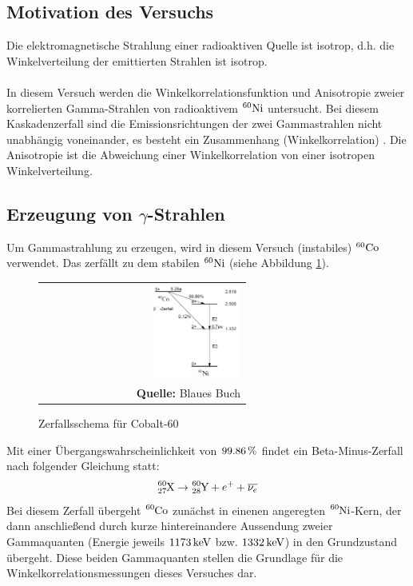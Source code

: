 \documentclass[a4paper,titlepage]{scrartcl}
\numberwithin{equation}{section}
\begin{document}
\subsection{Motivation des Versuchs}
Die elektromagnetische Strahlung einer radioaktiven Quelle ist isotrop, d.h. die Winkelverteilung der emittierten Strahlen ist isotrop.\\ \\
In diesem Versuch werden die Winkelkorrelationsfunktion und Anisotropie zweier korrelierten Gamma-Strahlen von radioaktivem $^{60}\ce{Ni}$ untersucht. Bei diesem Kaskadenzerfall sind die Emissionsrichtungen der zwei Gammastrahlen nicht unabhängig voneinander, es besteht ein Zusammenhang (Winkelkorrelation) \cite{web:korrelation}. Die Anisotropie ist die Abweichung einer Winkelkorrelation von einer isotropen Winkelverteilung.
\subsection{Erzeugung von $\gamma$-Strahlen}
Um Gammastrahlung zu erzeugen, wird in diesem Versuch (instabiles) $^{60}\ce{Co}$ verwendet. Das zerfällt zu dem stabilen $^{60}\ce{Ni}$ (siehe Abbildung \ref{fig:cobalt}).
\begin{figure}[H]
	\centering
	\begin{tabular}{@{}r@{}}
		\includegraphics[width=0.45\textwidth]{cobalt.PNG}\\
		\footnotesize\sffamily\textbf{Quelle:} Blaues Buch \cite{blauesBuch}
	\end{tabular}
	\caption{Zerfallsschema für Cobalt-60}
    \label{fig:cobalt}
\end{figure}
Mit einer Übergangswahrscheinlichkeit von $\unit[99.86]{\%}$ findet ein Beta-Minus-Zerfall nach folgender Gleichung statt:
\begin{equation*}
\ce{^{60}_{27}X} \rightarrow \ce{^{60}_{28}Y} + e^{+}+ \overline{\nu_e}
\end{equation*}
Bei diesem Zerfall übergeht $\ce{^{60}Co}$ zunächst in einenen angeregten $\ce{^{60}Ni}$-Kern, der dann anschließend durch kurze hintereinandere Aussendung zweier Gammaquanten (Energie jeweils $\unit[1173]{keV}$ bzw. $\unit[1332]{keV}$) in den Grundzustand übergeht. Diese beiden Gammaquanten stellen die Grundlage für die Winkelkorrelationsmessungen dieses Versuches dar.
\end{document}
